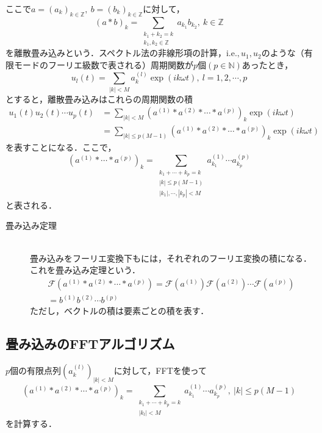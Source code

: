 \documentclass[11pt,a4paper,titlepage]{jsreport}
\theoremstyle{definition}
\begin{document}
ここで$a=(a_k)_{k\in\mathbb{Z}},\ b=(b_k)_{k\in\mathbb{Z}}$に対して，
\begin{equation*}
  (a * b)_k = \sum_{\substack{{k_1+k_2=k} \\ {k_1,k_2\in\mathbb{Z}}}} a_{k_1}b_{k_2},\ k\in\mathbb{Z}
\end{equation*}
を離散畳み込みという．スペクトル法の非線形項の計算，$\mathrm{i.e.},u_1,u_2$のような（有限モードのフーリエ級数で表される）周期関数が$p個(p\in\mathbb{N})$あったとき，
\begin{equation*}
  u_l(t) = \sum_{|k|<M} a_k^{(l)} \exp(ik\omega t),\ l=1,2,\cdots,p
\end{equation*}
とすると，離散畳み込みはこれらの周期関数の積
\begin{align*}
  u_1(t)u_2(t)\cdots u_p(t) & = \sum_{|k|<M} \left(a^{(1)} * a^{(2)} * \cdots * a^{(p)}\right)_k \exp(ik\omega t)          \\
                            & = \sum_{|k|\leq p(M-1)} \left(a^{(1)} * a^{(2)} * \cdots * a^{(p)}\right)_k \exp(ik\omega t)
\end{align*}
を表すことになる．ここで，
\begin{equation*}
  \left( a^{(1)} * \cdots * a^{(p)} \right)_k = \sum_{\substack{{k_1+\cdots+k_p=k} \\ {|k| \leq p(M-1)} \\ {|k_1|,\cdots,|k_p|<M}}} a_{k_1}^{(1)}\cdots a_{k_p}^{(p)}
\end{equation*}
と表される．

\begin{description}
  \item[畳み込み定理]
    \quad \\
    畳み込みをフーリエ変換下もには，それぞれのフーリエ変換の積になる．これを畳み込み定理という．
    \begin{align*}
      \mathcal{F} \left( a^{(1)} * a^{(2)} * \cdots * a^{(p)} \right)= \mathcal{F} \left( a^{(1)} \right) \mathcal{F} \left( a^{(2)} \right) \cdots \mathcal{F} \left( a^{(p)} \right) \\
      = b^{(1)}b^{(2)}\cdots b^{(p)}
    \end{align*}
    ただし，ベクトルの積は要素ごとの積を表す．
\end{description}


\subsection{畳み込みのFFTアルゴリズム}
$p$個の有限点列$\left(a_{k}^{(l)}\right)_{|k|<M}$に対して，FFTを使って
\begin{equation*}
  \left(a^{(1)} * a^{(2)} * \cdots * a^{(p)}\right)_k = \sum_{\substack{{k_1+\cdots+k_p=k} \\ {|k_l|<M}}} a_{k_1}^{(1)}\cdots a_{k_p}^{(p)},\ |k| \leq p(M-1)
\end{equation*}
を計算する．
\end{document}
